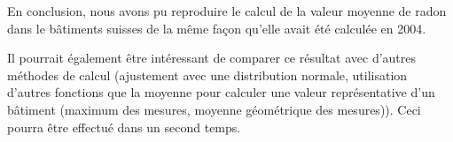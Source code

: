 En conclusion, nous avons pu reproduire le calcul de la valeur moyenne de radon dans le bâtiments suisses de la même façon qu'elle avait été calculée en 2004. 

Il pourrait également être intéressant de comparer ce résultat avec d'autres méthodes de calcul (ajustement avec une distribution normale, utilisation d'autres fonctions que la moyenne pour calculer une valeur représentative d'un bâtiment (maximum des mesures, moyenne géométrique des mesures)). Ceci pourra être effectué dans un second temps.